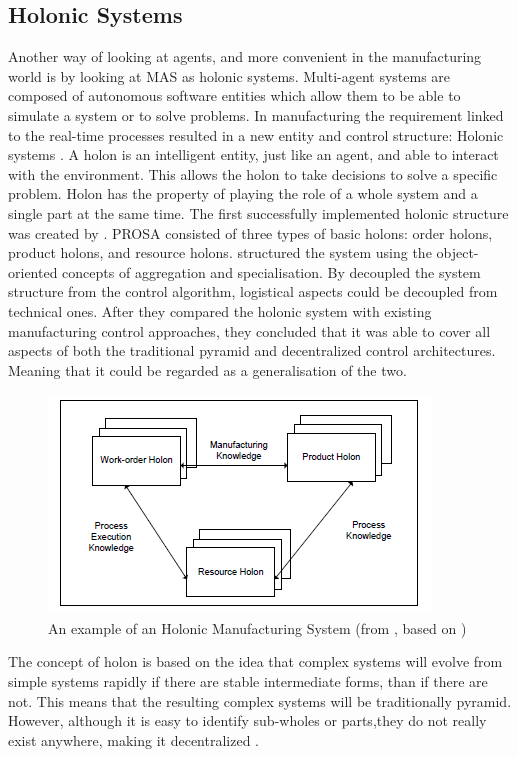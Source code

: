 \subsection{Holonic Systems}
Another way of looking at agents, and more convenient in the manufacturing world is by looking at MAS as holonic systems. Multi-agent systems are composed of autonomous software entities which allow them to be able to simulate a system or to solve problems. In manufacturing the requirement linked to the real-time processes resulted in a new entity and control structure: Holonic systems \citep{giret2005multi}. A holon is an intelligent entity, just like an agent, and able to interact with the environment. This allows the holon to take decisions to solve a specific problem. Holon has the property of playing the role of a whole system and a single part at the same time. The first successfully implemented holonic structure was created by \citet{van1998reference}. PROSA consisted of three types of basic holons: order holons, product holons, and resource holons. \citet{van1998reference} structured the system using the object-oriented concepts of aggregation and specialisation. By decoupled the system structure from the control algorithm, logistical aspects could be decoupled from technical ones. After they compared the holonic system with existing manufacturing control approaches, they concluded that it was able to cover all aspects of both the traditional pyramid and decentralized control architectures. Meaning that it could be regarded as a generalisation of the two. 
\begin{figure}[h]
\centering
\includegraphics[width=0.7\linewidth]{img/holonic_manufacturing}
\caption{An example of an Holonic Manufacturing System (from \citet{giret2005multi}, based on \citet{van1998reference})}
\label{fig:holonicmanufacturing}
\end{figure}

The concept of holon is based on the idea that complex systems will evolve from simple systems rapidly if there are stable intermediate forms, than if there are not. This means that the resulting complex systems will be traditionally pyramid. However, although it is easy to identify sub-wholes or parts,they do not really exist anywhere, making it decentralized \citep{van1998reference}.

